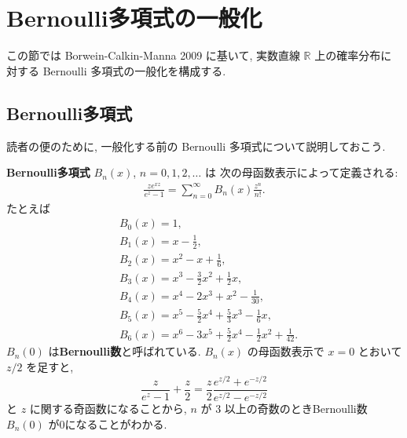 \documentclass[12pt,twoside]{jarticle}
\newcommand\BF{\bfseries}
\newcommand\R{{\mathbb R}} %
\theoremstyle{jplain}
\theoremstyle{jplain}
\theoremstyle{jplain}
\numberwithin{theorem}{section}
\numberwithin{equation}{section}
\numberwithin{figure}{section}
\numberwithin{table}{section}
\begin{document}
\title{\TITLE}
\author{\AUTHOR}
\date{\DATE}
\maketitle
\begin{abstract}
\ABSTRACT
\end{abstract}
\tableofcontents

\section{Bernoulli多項式の一般化}
\label{sec:Bernoulli}

この節では Borwein-Calkin-Manna 2009 \cite{BCM2009} に基いて,
実数直線 $\R$ 上の確率分布に対する Bernoulli 多項式の一般化を構成する.


\subsection{Bernoulli多項式}
\label{sec:B_n}

読者の便のために, 一般化する前の Bernoulli 多項式について説明しておこう.

{\BF Bernoulli多項式} $B_n(x)$, $n=0,1,2,\ldots$ は
次の母函数表示によって定義される:
\begin{align*}
  \frac{z e^{xz}}{e^z-1} = \sum_{n=0}^\infty B_n(x)\frac{z^n}{n!}.
\end{align*}
たとえば
\begin{align*}
  & B_0(x)=1, \\
  & B_1(x)=x-\frac12,\\
  & B_2(x)=x^2-x+\frac16, \\
  & B_3(x)=x^3-\frac32x^2+\frac12x,\\
  & B_4(x)=x^4-2x^3+x^2-\frac1{30}, \\
  & B_5(x)=x^5-\frac52x^4+\frac53x^3-\frac16x,\\
  & B_6(x)=x^6-3x^5+\frac52x^4-\frac12x^2+\frac1{42}.
\end{align*}
$B_n(0)$ は{\BF Bernoulli数}と呼ばれている.
$B_n(x)$ の母函数表示で $x=0$ とおいて $z/2$ を足すと,
\begin{equation*}
  \frac{z}{e^z-1}+\frac{z}2
  =\frac{z}2\frac{e^{z/2}+e^{-z/2}}{e^{z/2}-e^{-z/2}}
\end{equation*}
と $z$ に関する奇函数になることから,
$n$ が $3$ 以上の奇数のときBernoulli数 $B_n(0)$ が0になることがわかる.
\end{document}
